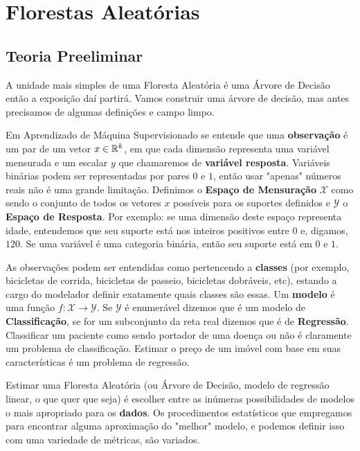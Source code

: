 
\chapter{Florestas Aleatórias}

\section{Teoria Preeliminar}

A unidade mais simples de uma Floresta Aleatória é uma Árvore de Decisão \cite{breiman2017classification} então a exposição daí partirá. Vamos construir uma árvore de decisão, mas antes precisamos de algumas definições e campo limpo. 

Em Aprendizado de Máquina Supervisionado se entende que uma \textbf{observação} é um par de um vetor $x \in \mathbb{R}^k$, em que cada dimensão representa uma variável mensurada e um escalar $y$ que chamaremos de \textbf{variável resposta}. Variáveis binárias podem ser representadas por pares $0$ e $1$, então usar "apenas" números reais não é uma grande limitação. Definimos o \textbf{Espaço de Mensuração} $\mathcal{X}$ como sendo o conjunto de todos os vetores $x$ possíveis para os suportes definidos e $\mathcal{Y}$ o \textbf{Espaço de Resposta}. Por exemplo: se uma dimensão deste espaço representa idade, entendemos que seu suporte está nos inteiros positivos entre $0$ e, digamos, $120$. Se uma variável é uma categoria binária, então seu suporte está em $0$ e $1$. 

As observações podem ser entendidas como pertencendo a \textbf{classes} (por exemplo, bicicletas de corrida, bicicletas de passeio, bicicletas dobráveis, etc), estando a cargo do modelador definir exatamente quais classes são essas. Um \textbf{modelo} é uma função $f: \mathcal{X} \to \mathcal{Y}$. Se $\mathcal{Y}$ é enumerável dizemos que é um modelo de \textbf{Classificação}, se for um subconjunto da reta real dizemos que é de \textbf{Regressão}. Classificar um paciente como sendo portador de uma doença ou não é claramente um problema de classificação. Estimar o preço de um imóvel com base em suas características é um problema de regressão. 

Estimar uma Floresta Aleatória (ou Árvore de Decisão, modelo de regressão linear, o que quer que seja) é  escolher entre as inúmeras possibilidades de modelos o mais apropriado para os \textbf{dados}. Os procedimentos estatísticos que empregamos para encontrar alguma aproximação do "melhor" modelo, e podemos definir isso com uma variedade de métricas, são variados.


